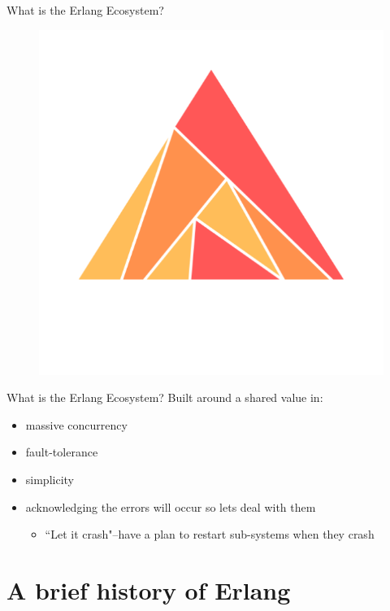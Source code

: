 \documentclass[
  ignorenonframetext,
  aspectratio=169]{beamer}
\providecommand{\tightlist}{%
  \setlength{\itemsep}{0pt}\setlength{\parskip}{0pt}}
\begin{document}
\begin{frame}{What is the Erlang Ecosystem?}
\begin{figure}
\begin{minipage}{.24\textwidth}
  \centering
  \includegraphics[width=.8\linewidth]{./img/ash-logo.png}
\end{minipage}
\end{figure}
\end{frame}

\begin{frame}{What is the Erlang Ecosystem?}
\label{what-is-the-erlang-ecosystem-2}
Built around a shared value in:

\begin{itemize}
\tightlist
\item
  massive concurrency
\item
  fault-tolerance
\item
  simplicity
\item
  acknowledging the errors will occur so let\textquotesingle s deal with
  them

  \begin{itemize}
  \tightlist
  \item
    ``Let it crash"--have a plan to restart sub-systems when they crash
  \end{itemize}
\end{itemize}
\end{frame}

\section{A brief history of Erlang}\label{a-brief-history-of-erlang}
\end{document}

